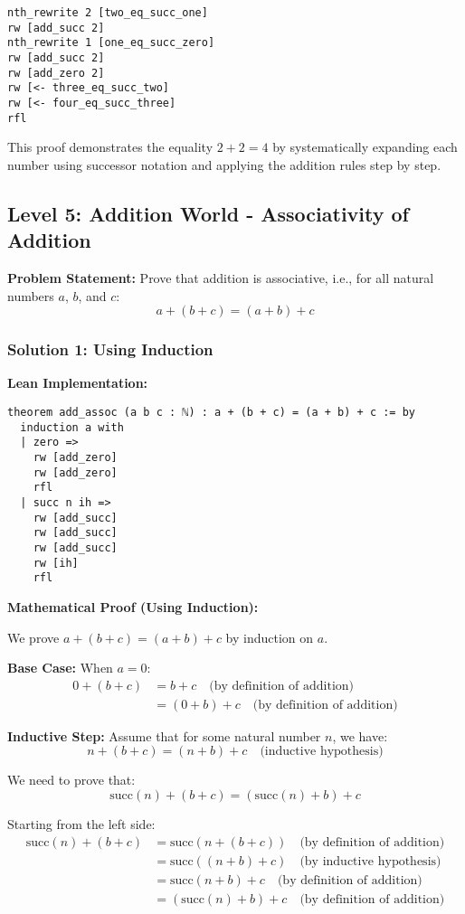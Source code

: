 \documentclass{article}
\theoremstyle{plain}
\theoremstyle{definition}
\theoremstyle{remark}
\begin{document}
\begin{verbatim}
nth_rewrite 2 [two_eq_succ_one]
rw [add_succ 2]
nth_rewrite 1 [one_eq_succ_zero]
rw [add_succ 2]
rw [add_zero 2]
rw [<- three_eq_succ_two]
rw [<- four_eq_succ_three]
rfl
\end{verbatim}

This proof demonstrates the equality $2 + 2 = 4$ by systematically expanding each number using successor notation and applying the addition rules step by step.

\subsection{Level 5: Addition World - Associativity of Addition}

\textbf{Problem Statement:} Prove that addition is associative, i.e., for all natural numbers $a$, $b$, and $c$:
$$a + (b + c) = (a + b) + c$$

\subsubsection{Solution 1: Using Induction}

\textbf{Lean Implementation:}
\begin{verbatim}
theorem add_assoc (a b c : ℕ) : a + (b + c) = (a + b) + c := by
  induction a with
  | zero => 
    rw [add_zero]
    rw [add_zero]
    rfl
  | succ n ih =>
    rw [add_succ]
    rw [add_succ]
    rw [add_succ]
    rw [ih]
    rfl
\end{verbatim}

\textbf{Mathematical Proof (Using Induction):}

We prove $a + (b + c) = (a + b) + c$ by induction on $a$.

\textbf{Base Case:} When $a = 0$:
\begin{align}
0 + (b + c) &= b + c \quad \text{(by definition of addition)} \\
&= (0 + b) + c \quad \text{(by definition of addition)}
\end{align}

\textbf{Inductive Step:} Assume that for some natural number $n$, we have:
$$n + (b + c) = (n + b) + c \quad \text{(inductive hypothesis)}$$

We need to prove that:
$$\text{succ}(n) + (b + c) = (\text{succ}(n) + b) + c$$

Starting from the left side:
\begin{align}
\text{succ}(n) + (b + c) &= \text{succ}(n + (b + c)) \quad \text{(by definition of addition)} \\
&= \text{succ}((n + b) + c) \quad \text{(by inductive hypothesis)} \\
&= \text{succ}(n + b) + c \quad \text{(by definition of addition)} \\
&= (\text{succ}(n) + b) + c \quad \text{(by definition of addition)}
\end{align}
\end{document}
